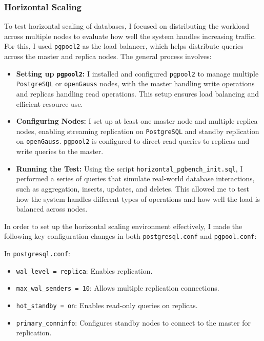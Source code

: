 \documentclass[12pt,a4paper,cs4size]{ctexart}
\begin{document}
\vspace{0.5cm}

\subsubsection*{Horizontal Scaling}

To test horizontal scaling of databases, I focused on distributing the workload across multiple nodes to evaluate how well the system handles increasing traffic. For this, I used \texttt{pgpool2}\cite{pgpool-en}\cite{pgpool-zhcn} as the load balancer, which helps distribute queries across the master and replica nodes. The general process involves:
\begin{itemize}
    \item\textbf{Setting up \texttt{pgpool2}:} I installed and configured \texttt{pgpool2} to manage multiple \texttt{PostgreSQL} or \texttt{openGauss} nodes, with the master handling write operations and replicas handling read operations. This setup ensures load balancing and efficient resource use.
    \item\textbf{Configuring Nodes:} I set up at least one master node and multiple replica nodes, enabling streaming replication on \texttt{PostgreSQL} and standby replication on \texttt{openGauss}. \texttt{pgpool2} is configured to direct read queries to replicas and write queries to the master.
    \item\textbf{Running the Test:} Using the script \texttt{horizontal\_pgbench\_init.sql}\cite{github2024}, I performed a series of queries that simulate real-world database interactions, such as aggregation, inserts, updates, and deletes. This allowed me to test how the system handles different types of operations and how well the load is balanced across nodes.
\end{itemize}

In order to set up the horizontal scaling environment effectively, I made the following key configuration changes in both \texttt{postgresql.conf} and \texttt{pgpool.conf}:

In \texttt{postgresql.conf}:

\begin{itemize}
    \item \texttt{wal\_level = replica}: Enables replication.
    \item \texttt{max\_wal\_senders = 10}: Allows multiple replication connections.
    \item \texttt{hot\_standby = on}: Enables read-only queries on replicas.
    \item \texttt{primary\_conninfo}: Configures standby nodes to connect to the master for replication.
\end{itemize}
\end{document}
